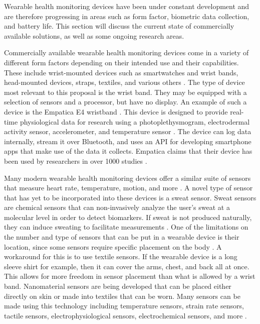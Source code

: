 Wearable health monitoring devices have been under constant development and are therefore progressing in areas such as
form factor, biometric data collection, and battery life.  This section will
discuss the current state of commercially available solutions, as well as some
ongoing research areas.

Commercially available wearable health monitoring devices come in a variety of
different form factors depending on their intended use and their capabilities.
These include wrist-mounted devices such as smartwatches and wrist bands,
head-mounted devices, straps, textiles, and various
others \cite{Seneviratne2017}.  The type of device most relevant to this
proposal is the wrist band.  They may be equipped with a selection of sensors
and a processor, but have no display.  An example of such a device is the Empatica
E4 wristband \cite{McCarthy2016}.  This device is designed to provide real-time
physiological data for research using a photoplethysmogram, electrodermal
activity sensor, accelerometer, and temperature sensor \cite{empatica}. The
device can log data internally, stream it over Bluetooth, and uses an API for
developing smartphone apps that make use of the data it collects. Empatica
claims that their device has been used by researchers in over 1000 studies
\cite{empatica}.

Many modern wearable health monitoring devices offer a similar suite of sensors
that measure heart rate, temperature, motion, and more
\cite{Seneviratne2017}.  A novel type of sensor that has yet to be incorporated
into these devices is a sweat sensor.  Sweat sensors are chemical sensors that
can non-invasively analyze the user's sweat at a molecular level in order to
detect biomarkers.  If sweat is not produced naturally, they can induce
sweating to facilitate measurements \cite{Tai2018}.  One of the limitations on
the number and type of sensors that can be put in a wearable device is their
location, since some sensors require specific placement on the
body \cite{Baig2017}.  A workaround for this is to use textile sensors.  If the
wearable device is a long sleeve shirt for example, then it can cover the arms,
chest, and back all at once.  This allows for more freedom in sensor placement
than what is allowed by a wrist band.  Nanomaterial sensors are being developed
that can be placed either directly on skin or made into textiles that can be
worn.  Many sensors can be made using this technology including temperature
sensors, strain rate sensors, tactile sensors, electrophysiological sensors,
electrochemical sensors, and more \cite{Yai2018}.

